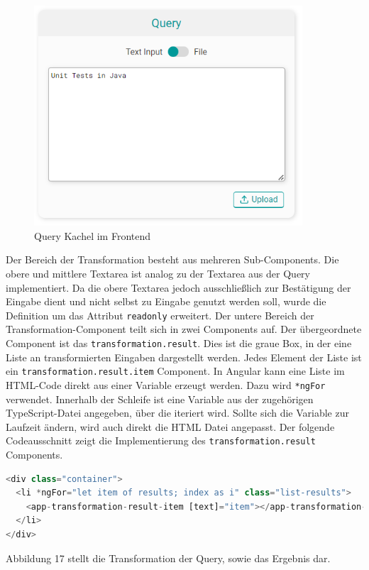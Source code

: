 \begin{figure}[H]
  \centering
    \includegraphics[width = 10cm]{bilder/websiteQuery}
    \caption{Query Kachel im Frontend}
\end{figure}

Der Bereich der Transformation besteht aus mehreren Sub-Components. Die obere und mittlere Textarea ist analog zu der Textarea aus der Query implementiert. Da die obere Textarea jedoch ausschließlich zur Bestätigung der Eingabe dient und nicht selbst zu Eingabe genutzt werden soll, wurde die Definition um das Attribut \texttt{readonly} erweitert. Der untere Bereich der Transformation-Component teilt sich in zwei Components auf. Der übergeordnete Component ist das \texttt{transformation.result}. Dies ist die graue Box, in der eine Liste an transformierten Eingaben dargestellt werden. Jedes Element der Liste ist ein \texttt{transformation.result.item} Component. In Angular kann eine Liste im HTML-Code direkt aus einer Variable erzeugt werden. Dazu wird \texttt{*ngFor} verwendet. Innerhalb der Schleife ist eine Variable aus der zugehörigen TypeScript-Datei angegeben, über die iteriert wird. Sollte sich die Variable zur Laufzeit ändern, wird auch direkt die HTML Datei angepasst. Der folgende Codeausschnitt zeigt die Implementierung des \texttt{transformation.result} Components.

\begin{lstlisting}[language=Python, caption={Anzeige der Results aus der Transformation}]
<div class="container">
  <li *ngFor="let item of results; index as i" class="list-results">
    <app-transformation-result-item [text]="item"></app-transformation-result-item>
  </li>
</div>
\end{lstlisting}

Abbildung 17 stellt die Transformation der Query, sowie das Ergebnis dar.

